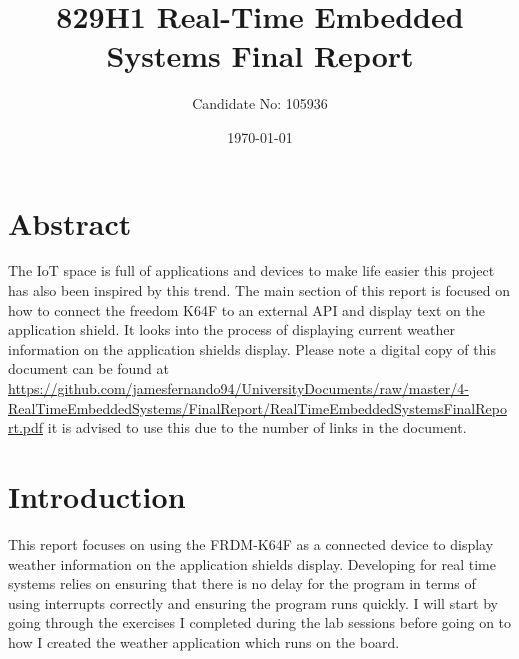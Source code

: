 \documentclass[a4paper,12pt]{scrartcl}
\title{829H1 Real-Time Embedded Systems Final Report}
\author{Candidate No: 105936}
\date{\today}
\begin{document}
	
	\begin{titlepage}
		\maketitle
	\end{titlepage}
	
	\tableofcontents
	\newpage

	\section{Abstract}
	{
		The IoT space is full of applications and devices to make life easier this project has also been inspired by this trend. The main section of this report is focused on how to connect the freedom K64F\cite{nxpproducts2014} to an external API and display text on the application shield. It looks into the process of displaying current weather information on the application shields display. Please note a digital copy of this document can be found at  \url{https://github.com/jamesfernando94/UniversityDocuments/raw/master/4-RealTimeEmbeddedSystems/FinalReport/RealTimeEmbeddedSystemsFinalReport.pdf} it is advised to use this due to the number of links in the document.
	}

	\section{Introduction}
	{
		This report focuses on using the FRDM-K64F\cite{nxpproducts2014} as a connected device to display weather information on the application shields display. Developing for real time systems relies on ensuring that there is no delay for the program in terms of using interrupts correctly and ensuring the program runs quickly. I will start by going through the exercises I completed during the lab sessions before going on to how I created the weather application which runs on the board. 
	}
	
\end{document}
